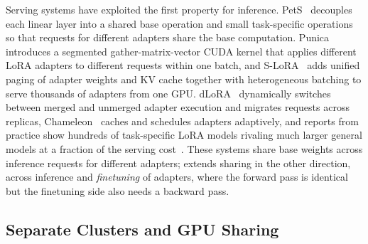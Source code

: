 Serving systems have exploited the first property for inference.
PetS~\cite{zhou2022pets} decouples each linear layer into a shared base operation and small task-specific operations so that requests for different adapters share the base computation.
Punica~\cite{chen2023punica} introduces a segmented gather-matrix-vector CUDA kernel that applies different LoRA adapters to different requests within one batch, and S-LoRA~\cite{sheng2023s} adds unified paging of adapter weights and KV cache together with heterogeneous batching to serve thousands of adapters from one GPU.
dLoRA~\cite{wu2024dlora} dynamically switches between merged and unmerged adapter execution and migrates requests across replicas, Chameleon~\cite{iliakopoulou2024chameleon} caches and schedules adapters adaptively, and reports from practice show hundreds of task-specific LoRA models rivaling much larger general models at a fraction of the serving cost~\cite{zhao2024lora}.
These systems share base weights across inference requests for different adapters; \FlexLLM extends sharing in the other direction, across inference and \emph{finetuning} of adapters, where the forward pass is identical but the finetuning side also needs a backward pass.

\subsection{Separate Clusters and GPU Sharing}
\label{background:subsec:gpu_sharing}

